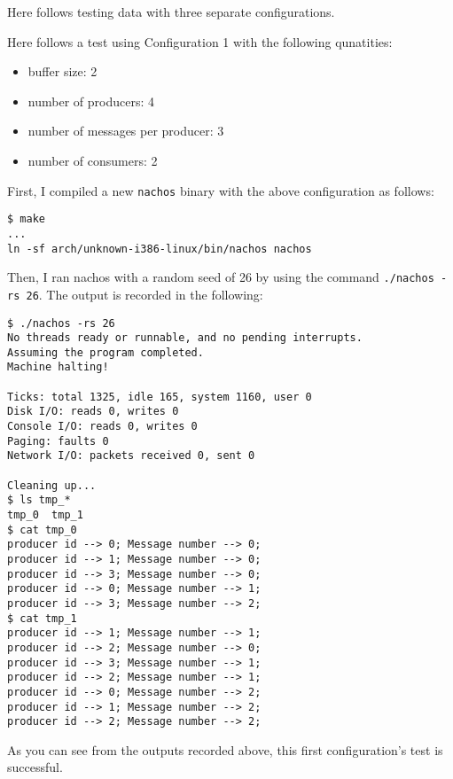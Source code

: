 \documentclass[11pt]{article}
\begin{document}
\begin{question}

    Here follows testing data with three separate configurations.

    \begin{subquestion}

        Here follows a test using Configuration 1 with the following qunatities:
        \begin{itemize}
            \item{buffer size: 2}
            \item{number of producers: 4}
            \item{number of messages per producer: 3}
            \item{number of consumers: 2}
        \end{itemize}

        First, I compiled a new {\tt nachos} binary with the above configuration as follows:

        \begin{verbatim}
$ make
...
ln -sf arch/unknown-i386-linux/bin/nachos nachos
        \end{verbatim}

        Then, I ran nachos with a random seed of 26 by using the command {\tt ./nachos -rs 26}. The output is recorded in the following:

        \begin{verbatim}
$ ./nachos -rs 26
No threads ready or runnable, and no pending interrupts.
Assuming the program completed.
Machine halting!

Ticks: total 1325, idle 165, system 1160, user 0
Disk I/O: reads 0, writes 0
Console I/O: reads 0, writes 0
Paging: faults 0
Network I/O: packets received 0, sent 0

Cleaning up...
$ ls tmp_*
tmp_0  tmp_1
$ cat tmp_0
producer id --> 0; Message number --> 0;
producer id --> 1; Message number --> 0;
producer id --> 3; Message number --> 0;
producer id --> 0; Message number --> 1;
producer id --> 3; Message number --> 2;
$ cat tmp_1
producer id --> 1; Message number --> 1;
producer id --> 2; Message number --> 0;
producer id --> 3; Message number --> 1;
producer id --> 2; Message number --> 1;
producer id --> 0; Message number --> 2;
producer id --> 1; Message number --> 2;
producer id --> 2; Message number --> 2;
        \end{verbatim}

        As you can see from the outputs recorded above, this first configuration's test is successful.


\end{subquestion}
\end{question}
\end{document}
